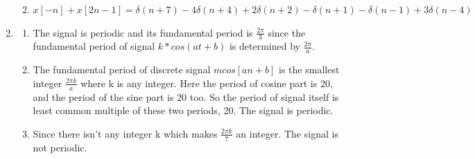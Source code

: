 \documentclass[10pt,a4paper, margin=1in]{article}
\begin{document}
\begin{enumerate}
\begin{enumerate}
              \item %
              $x[-n] + x[2n-1] = \delta(n+7) - 4\delta(n + 4) + 2\delta(n + 2) - \delta(n + 1) - \delta(n - 1) + 3\delta(n - 4)$ 
          \end{enumerate}

    \item %
          \begin{enumerate}
              \item The signal is periodic and its fundamental period is $\frac{2 \pi}{3}$ since the fundamental
                    period of signal $k*cos(at+b)$ is determined by $\frac{2 \pi}{a}$.
              \item The fundamental period of discrete signal $mcos[an+b]$ is the smallest integer $\frac{2\pi k }{a}$ where k is any integer. Here the period of cosine part is 20, and the period of the sine part is 20 too. So the period of signal itself is least common multiple of these two periods, 20. The signal is periodic.
              \item Since there isn't any integer k which makes $\frac{2\pi k}{7}$ an integer. The signal is not periodic.
          \end{enumerate}


\end{enumerate}
\end{document}
